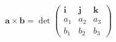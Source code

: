 \documentclass[preview]{standalone}
\begin{document}
\begin{align*}
\mathbf{a} \times \mathbf{b} = \det \begin{pmatrix} \mathbf{i} & \mathbf{j} & \mathbf{k} \\ a_1 & a_2 & a_3 \\ b_1 & b_2 & b_3 \end{pmatrix}
\end{align*}
\end{document}
